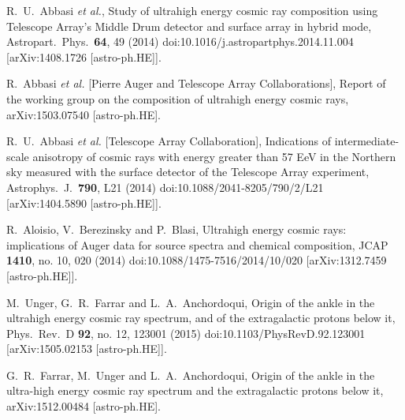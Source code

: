 \documentclass[aps,prd,twocolumn,superscriptaddress,tightenlines,nofootinbib]{revtex4-1}
\begin{document}
\begin{thebibliography}{99}
  R.~U.~Abbasi {\it et al.},
  {\color{rossoCP3} Study of ultrahigh energy cosmic ray composition using Telescope Array’s Middle Drum detector and surface array in hybrid mode},
  Astropart.\ Phys.\  {\bf 64}, 49 (2014)
  doi:10.1016/j.astropartphys.2014.11.004
  [arXiv:1408.1726 [astro-ph.HE]].





  R.~Abbasi {\it et al.} [Pierre Auger and Telescope Array Collaborations],
  {\color{rossoCP3} Report of the working group on the composition of ultrahigh energy cosmic rays},
  arXiv:1503.07540 [astro-ph.HE].

  R.~U.~Abbasi {\it et al.} [Telescope Array Collaboration],
 {\color{rossoCP3} Indications of intermediate-scale anisotropy of cosmic rays with energy greater than 57 EeV in the Northern sky measured with the surface detector of the Telescope Array experiment},
  Astrophys.\ J.\  {\bf 790}, L21 (2014)
  doi:10.1088/2041-8205/790/2/L21
  [arXiv:1404.5890 [astro-ph.HE]].


  R.~Aloisio, V.~Berezinsky and P.~Blasi,
  {\color{rossoCP3} Ultrahigh energy cosmic rays: implications of Auger data for source spectra and chemical composition},
  JCAP {\bf 1410}, no. 10, 020 (2014)
  doi:10.1088/1475-7516/2014/10/020
  [arXiv:1312.7459 [astro-ph.HE]].


  M.~Unger, G.~R.~Farrar and L.~A.~Anchordoqui,
 {\color{rossoCP3} Origin of the ankle in the ultrahigh energy cosmic ray spectrum, and of the extragalactic protons below it},
  Phys.\ Rev.\ D {\bf 92}, no. 12, 123001 (2015)
  doi:10.1103/PhysRevD.92.123001
  [arXiv:1505.02153 [astro-ph.HE]].


  G.~R.~Farrar, M.~Unger and L.~A.~Anchordoqui,
  {\color{rossoCP3} Origin of the ankle in the ultra-high energy cosmic ray spectrum and  the extragalactic protons below it},
  arXiv:1512.00484 [astro-ph.HE].


\end{thebibliography}
\end{document}
